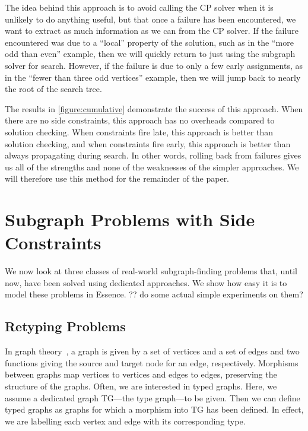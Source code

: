 \documentclass[runningheads]{llncs}
\begin{document}
The idea behind this approach is to avoid calling the CP solver when it is unlikely to do anything
useful, but that once a failure has been encountered, we want to extract as much information as we
can from the CP solver. If the failure encountered was due to a ``local'' property of the solution,
such as in the ``more odd than even'' example, then we will quickly return to just using the
subgraph solver for search. However, if the failure is due to only a few early assignments, as in
the ``fewer than three odd vertices'' example, then we will jump back to nearly the root of the
search tree.

The results in \cref{figure:cumulative} demonstrate the success of this approach. When there are no
side constraints, this approach has no overheads compared to solution checking. When constraints
fire late, this approach is better than solution checking, and when constraints fire early, this
approach is better than always propagating during search. In other words, rolling back from failures
gives us all of the strengths and none of the weaknesses of the simpler approaches. We will
therefore use this method for the remainder of the paper.

\section{Subgraph Problems with Side Constraints}\label{section:problems}

We now look at three classes of real-world subgraph-finding problems that, until now, have been
solved using dedicated approaches. We show how easy it is to model these problems in Essence. ?? do
some actual simple experiments on them?

\subsection{Retyping Problems}\label{section:typegraphs}

  In graph theory~\cite{Ehrig+06}, a graph is given by a set of vertices and a set of edges and two functions giving the source and target node for an edge, respectively.
  Morphisms between graphs map vertices to vertices and edges to edges, preserving the structure of the graphs.
  Often, we are interested in typed graphs.
  Here, we assume a dedicated graph TG---the type graph---to be given.
  Then we can define typed graphs as graphs for which a morphism into TG has been defined.
  In effect, we are labelling each vertex and edge with its corresponding type.
  
\end{document}
